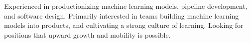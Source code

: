 

\begin{cvparagraph}

Experienced in productionizing machine learning models, pipeline development, and software design.  Primarily interested in teams building machine learning models into products, and cultivating a strong culture of learning. Looking for positions that upward growth and mobility is possible.
\end{cvparagraph}
